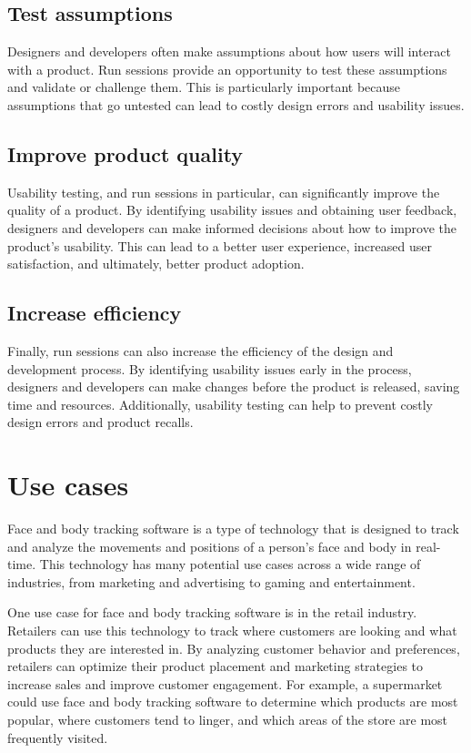 \subsection{Test assumptions}
Designers and developers often make assumptions about how users will interact with a product. Run sessions 
provide an opportunity to test these assumptions and validate or challenge them. This is particularly important 
because assumptions that go untested can lead to costly design errors and usability issues.

\subsection{Improve product quality}
Usability testing, and run sessions in particular, can significantly improve the quality of a product. 
By identifying usability issues and obtaining user feedback, designers and developers can make informed 
decisions about how to improve the product's usability. This can lead to a better user experience, 
increased user satisfaction, and ultimately, better product adoption.

\subsection{Increase efficiency}
Finally, run sessions can also increase the efficiency of the design and development process. 
By identifying usability issues early in the process, designers and developers can make changes 
before the product is released, saving time and resources. Additionally, usability testing can 
help to prevent costly design errors and product recalls.

\section{Use cases}
Face and body tracking software is a type of technology that is designed to track and analyze the movements and positions 
of a person's face and body in real-time. This technology has many potential use cases across a wide range of industries, 
from marketing and advertising to gaming and entertainment.

One use case for face and body tracking software is in the retail industry. Retailers can use this technology to track 
where customers are looking and what products they are interested in. By analyzing customer behavior and preferences, 
retailers can optimize their product placement and marketing strategies to increase sales and improve customer engagement. 
For example, a supermarket could use face and body tracking software to determine which products are most popular, where 
customers tend to linger, and which areas of the store are most frequently visited.

